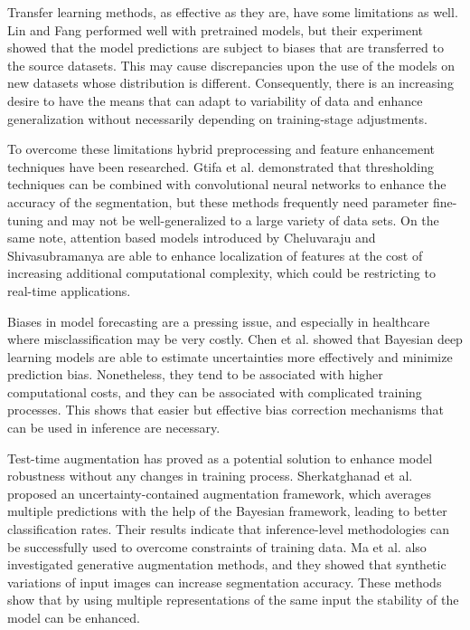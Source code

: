 \documentclass[a4paper,fleqn]{cas-dc}
\begin{document}
Transfer learning methods, as effective as they are, have some limitations as well. Lin and Fang \cite{ref2} performed well with pretrained models, but their experiment showed that the model predictions are subject to biases that are transferred to the source datasets. This may cause discrepancies upon the use of the models on new datasets whose distribution is different. Consequently, there is an increasing desire to have the means that can adapt to variability of data and enhance generalization without necessarily depending on training-stage adjustments.

To overcome these limitations hybrid preprocessing and feature enhancement techniques have been researched. Gtifa et al. \cite{ref3} demonstrated that thresholding techniques can be combined with convolutional neural networks to enhance the accuracy of the segmentation, but these methods frequently need parameter fine-tuning and may not be well-generalized to a large variety of data sets. On the same note, attention based models introduced by Cheluvaraju and Shivasubramanya \cite{ref5} are able to enhance localization of features at the cost of increasing additional computational complexity, which could be restricting to real-time applications.

Biases in model forecasting are a pressing issue, and especially in healthcare where misclassification may be very costly. Chen et al. \cite{ref4} showed that Bayesian deep learning models are able to estimate uncertainties more effectively and minimize prediction bias. Nonetheless, they tend to be associated with higher computational costs, and they can be associated with complicated training processes. This shows that easier but effective bias correction mechanisms that can be used in inference are necessary.

Test-time augmentation has proved as a potential solution to enhance model robustness without any changes in training process. Sherkatghanad et al. \cite{ref6} proposed an uncertainty-contained augmentation framework, which averages multiple predictions with the help of the Bayesian framework, leading to better classification rates. Their results indicate that inference-level methodologies can be successfully used to overcome constraints of training data. Ma et al. \cite{ref7} also investigated generative augmentation methods, and they showed that synthetic variations of input images can increase segmentation accuracy. These methods show that by using multiple representations of the same input the stability of the model can be enhanced.
\end{document}
